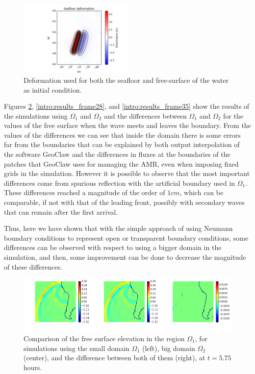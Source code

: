 \begin{figure}
	\center
	\includegraphics[width=0.5\textwidth]{figures/GeoclawChile2010_faultUinit.png}
	\caption{Deformation used for both the seafloor and free-surface of the water as initial condition.}
	\label{intro:qinit}
\end{figure}

Figures \ref{intro:results_frame23}, \ref{intro:results_frame28}, and \ref{intro:results_frame35} show the results of the simulations using $\Omega_1$ and $\Omega_2$ and the differences between $\Omega_1$ and $\Omega_2$ for the values of the free surface when the wave meets and leaves the boundary. From the values of the differences we can see that inside the domain there is some errors far from the boundaries that can be explained by both output interpolation of the software GeoClaw and the differences in fluxes at the boundaries of the patches that GeoClaw uses for managing the AMR, even when imposing fixed grids in the simulation. However it is possible to observe that the most important differences come from spurious reflection with the artificial boundary used in $\Omega_1$. These differences reached a magnitude of the order of $1cm$, which can be comparable, if not with that of the leading front, possibly with secondary waves that can remain after the first arrival.

Thus, here we have shown that with the simple approach of using Neumann boundary conditions to represent open or transparent boundary conditions, some differences can be observed with respect to using a bigger domain in the simulation, and then, some improvement can be done to decrease the magnitude of these differences.



\begin{figure}
	\center
	\includegraphics[width=\textwidth]{figures/GeoclawChile2010_comparison_it23}
	
	\caption{Comparison of the free surface elevation in the region $\Omega_1$, for simulations using the small domain $\Omega_1$ (left), big domain $\Omega_2$ (center), and the difference between both of them (right), at $t=5.75$ hours.}
	\label{intro:results_frame23}
\end{figure}

